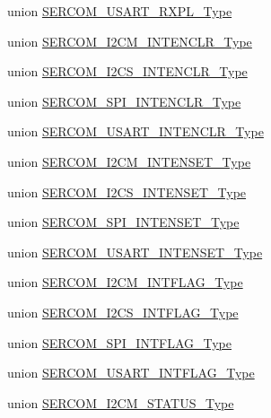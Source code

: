 \begin{DoxyCompactItemize}
union \hyperlink{union_s_e_r_c_o_m___u_s_a_r_t___r_x_p_l___type}{S\+E\+R\+C\+O\+M\+\_\+\+U\+S\+A\+R\+T\+\_\+\+R\+X\+P\+L\+\_\+\+Type}
\item 
union \hyperlink{union_s_e_r_c_o_m___i2_c_m___i_n_t_e_n_c_l_r___type}{S\+E\+R\+C\+O\+M\+\_\+\+I2\+C\+M\+\_\+\+I\+N\+T\+E\+N\+C\+L\+R\+\_\+\+Type}
\item 
union \hyperlink{union_s_e_r_c_o_m___i2_c_s___i_n_t_e_n_c_l_r___type}{S\+E\+R\+C\+O\+M\+\_\+\+I2\+C\+S\+\_\+\+I\+N\+T\+E\+N\+C\+L\+R\+\_\+\+Type}
\item 
union \hyperlink{union_s_e_r_c_o_m___s_p_i___i_n_t_e_n_c_l_r___type}{S\+E\+R\+C\+O\+M\+\_\+\+S\+P\+I\+\_\+\+I\+N\+T\+E\+N\+C\+L\+R\+\_\+\+Type}
\item 
union \hyperlink{union_s_e_r_c_o_m___u_s_a_r_t___i_n_t_e_n_c_l_r___type}{S\+E\+R\+C\+O\+M\+\_\+\+U\+S\+A\+R\+T\+\_\+\+I\+N\+T\+E\+N\+C\+L\+R\+\_\+\+Type}
\item 
union \hyperlink{union_s_e_r_c_o_m___i2_c_m___i_n_t_e_n_s_e_t___type}{S\+E\+R\+C\+O\+M\+\_\+\+I2\+C\+M\+\_\+\+I\+N\+T\+E\+N\+S\+E\+T\+\_\+\+Type}
\item 
union \hyperlink{union_s_e_r_c_o_m___i2_c_s___i_n_t_e_n_s_e_t___type}{S\+E\+R\+C\+O\+M\+\_\+\+I2\+C\+S\+\_\+\+I\+N\+T\+E\+N\+S\+E\+T\+\_\+\+Type}
\item 
union \hyperlink{union_s_e_r_c_o_m___s_p_i___i_n_t_e_n_s_e_t___type}{S\+E\+R\+C\+O\+M\+\_\+\+S\+P\+I\+\_\+\+I\+N\+T\+E\+N\+S\+E\+T\+\_\+\+Type}
\item 
union \hyperlink{union_s_e_r_c_o_m___u_s_a_r_t___i_n_t_e_n_s_e_t___type}{S\+E\+R\+C\+O\+M\+\_\+\+U\+S\+A\+R\+T\+\_\+\+I\+N\+T\+E\+N\+S\+E\+T\+\_\+\+Type}
\item 
union \hyperlink{union_s_e_r_c_o_m___i2_c_m___i_n_t_f_l_a_g___type}{S\+E\+R\+C\+O\+M\+\_\+\+I2\+C\+M\+\_\+\+I\+N\+T\+F\+L\+A\+G\+\_\+\+Type}
\item 
union \hyperlink{union_s_e_r_c_o_m___i2_c_s___i_n_t_f_l_a_g___type}{S\+E\+R\+C\+O\+M\+\_\+\+I2\+C\+S\+\_\+\+I\+N\+T\+F\+L\+A\+G\+\_\+\+Type}
\item 
union \hyperlink{union_s_e_r_c_o_m___s_p_i___i_n_t_f_l_a_g___type}{S\+E\+R\+C\+O\+M\+\_\+\+S\+P\+I\+\_\+\+I\+N\+T\+F\+L\+A\+G\+\_\+\+Type}
\item 
union \hyperlink{union_s_e_r_c_o_m___u_s_a_r_t___i_n_t_f_l_a_g___type}{S\+E\+R\+C\+O\+M\+\_\+\+U\+S\+A\+R\+T\+\_\+\+I\+N\+T\+F\+L\+A\+G\+\_\+\+Type}
\item 
union \hyperlink{union_s_e_r_c_o_m___i2_c_m___s_t_a_t_u_s___type}{S\+E\+R\+C\+O\+M\+\_\+\+I2\+C\+M\+\_\+\+S\+T\+A\+T\+U\+S\+\_\+\+Type}

\end{DoxyCompactItemize}
